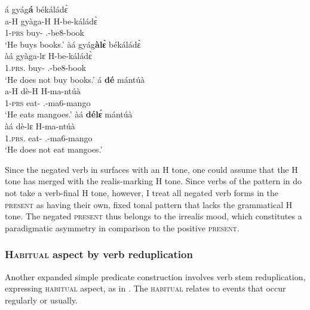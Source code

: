 \ea\label{leOBJ}

\ea  \label{leOBJa}
  \glll  á gyág{\bfseries á} békáládɛ̀ \\
         a-H gyàga-H H-be-káládɛ̀ \\
         1-\textsc{prs} buy-{\R} {\OBJ}.{\LINK}-be8-book\\
    \trans `He buys books.'
\ex \label{leOBJb}
  \glll  àá gyág{\bfseries àlɛ̀} békáládɛ̀\\
         àá gyàga-lɛ H-be-káládɛ̀ \\
         1.\textsc{prs}.{\NEG} buy-{\NEG} {\OBJ}.{\LINK}-be8-book\\
    \trans `He does not buy books.'
\ex\label{leOBJc}
  \glll  á {\bfseries dé} mántúà\\
          a-H dè-H H-ma-ntúà\\
           1-\textsc{prs} eat-{\R} {\OBJ}.{\LINK}-ma6-mango\\
    \trans `He eats mangoes.'
\ex \label{leOBJd} 
  \glll  àá {\bfseries délɛ́} mántúà\\
          àá dè-lɛ H-ma-ntúà\\
           1.\textsc{prs}.{\NEG} eat-{\NEG} {\OBJ}.{\LINK}-ma6-mango\\
    \trans `He does not eat mangoes.'
\z

\z


\noindent Since the negated verb in  surfaces with an H tone,  one could assume that the H tone has merged with the realis-marking H tone. Since verbs of the pattern in  do not take a verb-final H tone, however, I treat all negated verb forms in the \textsc{present} as having their own, fixed tonal pattern that lacks the grammatical H tone. The negated \textsc{present} thus belongs to the irrealis mood, which constitutes a paradigmatic asymmetry in comparison to the positive \textsc{present}.









\subsubsection{\textsc{Habitual} aspect by verb reduplication}
\label{sec:HAB}

Another expanded simple predicate construction involves verb stem reduplication, expressing \textsc{habitual} aspect, as in . The \textsc{habitual} relates to events that occur regularly or usually.

